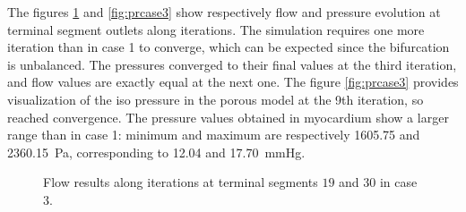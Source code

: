 \documentclass[a4paper, 11pt]{article} %
\begin{document}
The figures \ref{fig:flcase3} and \ref{fig:prcase3}\protect{} show respectively flow and pressure evolution at terminal segment outlets along iterations. The simulation requires one more iteration than in case 1 to converge, which can be expected since the bifurcation is unbalanced. The pressures converged to their final values at the third iteration, and flow values are exactly equal at the next one. 
The figure \ref{fig:prcase3}\protect{} provides visualization of the iso pressure in the porous model at the 9th iteration, so reached convergence. The pressure values obtained in myocardium show a larger range than in case 1: minimum and maximum are respectively \SI{1605.75}{} and \SI{2360.15}{Pa}, corresponding to \SI{12.04}{} and \SI{17.70}{\mmHg}. 

\begin{figure}[hbtp]
\begin{adjustwidth}{-2cm}{}
\begin{center}
\hspace{0.1cm}
\caption{Flow results along iterations at terminal segments $19$ and $30$ in case 3.}
\label{fig:flcase3}
\end{center}
\end{adjustwidth}
\end{figure}
\end{document}
